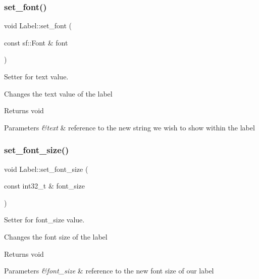 \subsubsection{\texorpdfstring{set\+\_\+font()}{set\_font()}}
{\footnotesize\ttfamily void Label\+::set\+\_\+font (\begin{DoxyParamCaption}\item[{const sf\+::\+Font \&}]{font }\end{DoxyParamCaption})}



Setter for text value. 

Changes the text value of the label

\begin{DoxyReturn}{Returns}
void 
\end{DoxyReturn}

\begin{DoxyParams}{Parameters}
{\em \&text} & reference to the new string we wish to show within the label \\
\hline
\end{DoxyParams}
\mbox{\label{class_label_a9e794358a782f0a4ba163bcbbe013612}} 
\subsubsection{\texorpdfstring{set\+\_\+font\+\_\+size()}{set\_font\_size()}}
{\footnotesize\ttfamily void Label\+::set\+\_\+font\+\_\+size (\begin{DoxyParamCaption}\item[{const int32\+\_\+t \&}]{font\+\_\+size }\end{DoxyParamCaption})}



Setter for font\+\_\+size value. 

Changes the font size of the label

\begin{DoxyReturn}{Returns}
void 
\end{DoxyReturn}

\begin{DoxyParams}{Parameters}
{\em \&font\+\_\+size} & reference to the new font size of our label \\
\hline
\end{DoxyParams}
\mbox{\label{class_label_aa6a355fe8daa25c3739affcf66d66f7f}} 
